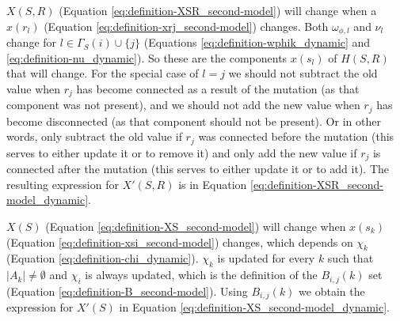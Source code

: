 $X(S,R)$ (Equation \eqref{eq:definition-XSR_second-model}) will change when a $x(r_l)$ (Equation \eqref{eq:definition-xrj_second-model}) changes.
Both $\omega_{\phi,l}$ and $\nu_l$ change for $l \in \Gamma_S(i) \cup \{j\}$ (Equations \eqref{eq:definition-wphik_dynamic} and \eqref{eq:definition-nu_dynamic}).
So these are the components $x(s_l)$ of $H(S,R)$ that will change.
For the special case of $l=j$ we should not subtract the old value when $r_j$ has become connected as a result of the mutation (as that component was not present), and we should not add the new value when $r_j$ has become disconnected (as that component should not be present).
Or in other words, only subtract the old value if $r_j$ was connected before the mutation (this serves to either update it or to remove it) and only add the new value if $r_j$ is connected after the mutation (this serves to either update it or to add it).
The resulting expression for $X'(S,R)$ is in Equation \eqref{eq:definition-XSR_second-model_dynamic}.

$X(S)$ (Equation \eqref{eq:definition-XS_second-model}) will change when $x(s_k)$ (Equation \eqref{eq:definition-xsi_second-model}) changes, which depends on $\chi_k$ (Equation \eqref{eq:definition-chi_dynamic}).
$\chi_k$ is updated for every $k$ such that $|A_k| \neq \emptyset$ and $\chi_i$ is always updated, which is the definition of the $B_{i,j}(k)$ set (Equation \eqref{eq:definition-B_second-model}).
Using $B_{i,j}(k)$ we obtain the expression for $X'(S)$ in Equation \eqref{eq:definition-XS_second-model_dynamic}.

